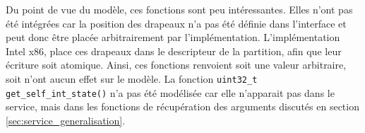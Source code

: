 		Du point de vue du modèle, ces fonctions sont peu intéressantes. Elles n'ont pas été intégrées car la position des drapeaux n'a pas été définie dans l'interface et peut donc être placée arbitrairement par l'implémentation. L'implémentation Intel x86, place ces drapeaux dans le descripteur de la partition, afin que leur écriture soit atomique. Ainsi, ces fonctions renvoient soit une valeur arbitraire, soit n'ont aucun effet sur le modèle. La fonction \texttt{uint32_t get_self_int_state()} n'a pas été modélisée car elle n'apparait pas dans le service, mais dans les fonctions de récupération des arguments discutés en section \ref{sec:service_generalisation}.\\

%
%
